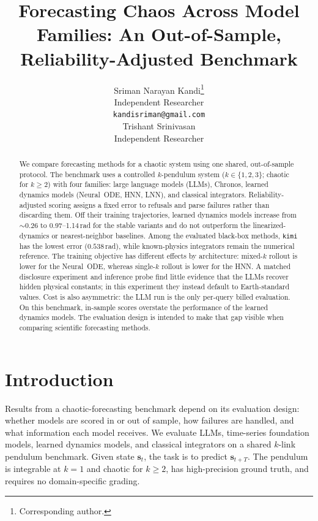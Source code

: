 \documentclass{article}
\title{Forecasting Chaos Across Model Families: An Out-of-Sample,
Reliability-Adjusted Benchmark}
\author{%
  Sriman Narayan Kandi\thanks{Corresponding author.} \\
  Independent Researcher \\
  \texttt{kandisriman@gmail.com} \\
  \And
  Trishant Srinivasan \\
  Independent Researcher \\
}
\begin{document}
\maketitle

\begin{abstract}
We compare forecasting methods for a chaotic system using one shared,
out-of-sample protocol. The benchmark uses a controlled $k$-pendulum system
($k\in\{1,2,3\}$; chaotic for $k\ge2$) with four families: large language models
(LLMs), Chronos, learned dynamics models (Neural~ODE, HNN, LNN), and classical
integrators. Reliability-adjusted scoring assigns a fixed error to refusals and
parse failures rather than discarding them. Off their training trajectories,
learned dynamics models increase from $\sim$0.26 to 0.97--1.14\,rad for the
stable variants and do not outperform the linearized-dynamics or nearest-neighbor
baselines. Among the evaluated black-box methods, \texttt{kimi} has the lowest
error ($0.538$\,rad), while known-physics integrators remain the numerical
reference. The training objective has different effects by architecture: mixed-$k$ rollout is
lower for the Neural~ODE, whereas single-$k$ rollout is lower for the HNN. A
matched disclosure experiment and inference probe find little evidence that the
LLMs recover hidden physical constants; in this experiment they instead default to
Earth-standard values. Cost is also asymmetric: the LLM run is the only
per-query billed evaluation. On this benchmark, in-sample scores overstate the
performance of the learned dynamics models. The evaluation design is intended to
make that gap visible when comparing scientific forecasting methods.
\end{abstract}

\section{Introduction}
Results from a chaotic-forecasting benchmark depend on its evaluation design: whether
models are scored in or out of sample, how failures are handled, and what information each
model receives. We evaluate LLMs, time-series foundation models, learned dynamics models,
and classical integrators on a shared $k$-link pendulum benchmark. Given state
$\mathbf{s}_t$, the task is to predict $\mathbf{s}_{t+T}$. The pendulum is integrable at
$k{=}1$ and chaotic for $k{\ge}2$, has high-precision ground truth, and requires no
domain-specific grading.
\end{document}
